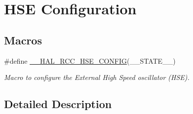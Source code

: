 \hypertarget{group___r_c_c___h_s_e___configuration}{\section{H\-S\-E Configuration}
\label{group___r_c_c___h_s_e___configuration}
}
\subsection*{Macros}
\begin{DoxyCompactItemize}
\item 
\#define \hyperlink{group___r_c_c___h_s_e___configuration_gaa3d98648399f15d02645ef84f6ca8e4b}{\-\_\-\-\_\-\-H\-A\-L\-\_\-\-R\-C\-C\-\_\-\-H\-S\-E\-\_\-\-C\-O\-N\-F\-I\-G}(\-\_\-\-\_\-\-S\-T\-A\-T\-E\-\_\-\-\_\-)
\begin{DoxyCompactList}\small\item\em Macro to configure the External High Speed oscillator (H\-S\-E). \end{DoxyCompactList}\end{DoxyCompactItemize}


\subsection{Detailed Description}


